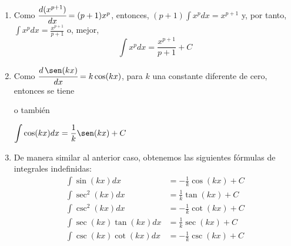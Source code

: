 \begin{enumerate}[leftmargin=1.2em,   itemindent=0pt,       labelwidth=\labelwidth,labelsep=0.5em,]

\item Como $\cfrac{d(x^{p+1})}{dx}= (p+1)x^{p}$, entonces, $(p+1) \displaystyle{\int x^{p}dx}=x^{p+1}$ y, por tanto, $\displaystyle{\int x^{p}dx=\frac{x^{p+1}}{p+1}}$ o, mejor,
\[
\int x^{p}dx=\frac{x^{p+1}}{p+1}+C
\]

\item Como $\cfrac{d\, \sen (kx)}{dx}=k\cos (kx)$, para $k$ una constante diferente de cero, entonces se tiene

\noindent{}

o también
\begin{center}
$\displaystyle{\int \cos (kx)dx=\frac{1}{k}\sen (kx)+C}$
\end{center}

\item De manera similar al anterior caso, obtenemos las siguientes fórmulas de integrales indefinidas:
{\small
\begin{align*}
\int \sin (kx)dx&=-\frac{1}{k}\cos (kx)+C\\
\int \sec ^{2}(kx)dx&=\frac{1}{k}\tan (kx)+C\\
\int \csc ^{2}(kx)dx&=-\frac{1}{k}\cot (kx)+C\\
\int \sec (kx) \tan (kx)dx&=\frac{1}{k}\sec (kx)+C\\
\int \csc (kx) \cot (kx)dx&=-\frac{1}{k}\csc (kx)+C
\end{align*}
}
%
%
%
%


\end{enumerate}
